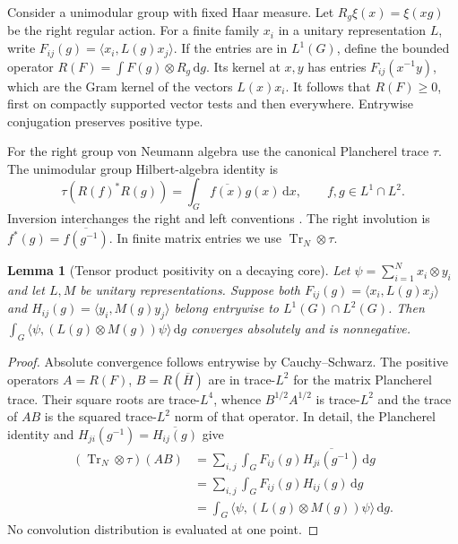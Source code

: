 \documentclass[11pt]{article}
\newtheorem{lemma}[theorem]{Lemma}
\newcommand{\Tr}{\operatorname{Tr}}
\newcommand{\dd}{\,\mathrm d}
\numberwithin{equation}{section}
\begin{document}
Consider a unimodular group with fixed Haar measure. Let
\(R_g\xi(x)=\xi(xg)\) be the right regular action. For a finite
family \(x_i\) in a unitary representation \(L\), write
\(F_{ij}(g)=\langle x_i,L(g)x_j\rangle\).
If the entries are in \(L^1(G)\), define the bounded operator
\(R(F)=\int F(g)\otimes R_g\dd g\). Its kernel at \(x,y\)
has entries \(F_{ij}(x^{-1}y)\), which are the Gram kernel of
the vectors \(L(x)x_i\). It follows that \(R(F)\ge0\), first
on compactly supported vector tests and then everywhere.
Entrywise conjugation preserves positive type.

For the right group von Neumann algebra use the canonical
Plancherel trace \(\tau\). The unimodular group Hilbert-algebra
identity is
\[
 \tau(R(f)^*R(g))=\int_G\overline{f(x)}g(x)\dd x,
                       \qquad f,g\in L^1\cap L^2.
\]
Inversion interchanges the right and left conventions
\cite{plancherel}. The right involution is
\(f^*(g)=\overline{f(g^{-1})}\). In finite matrix entries we use
\(\Tr_N\otimes\tau\).

\begin{lemma}[Tensor product positivity on a decaying core]
\label{lem:convolution}
Let \(\psi=\sum_{i=1}^{N}x_i\otimes y_i\) and let \(L,M\) be
unitary representations. Suppose both
\(F_{ij}(g)=\langle x_i,L(g)x_j\rangle\) and
\(H_{ij}(g)=\langle y_i,M(g)y_j\rangle\) belong entrywise to
\(L^1(G)\cap L^2(G)\). Then
\(\int_G\langle\psi,(L(g)\otimes M(g))\psi\rangle\dd g\)
converges absolutely and is nonnegative.
\end{lemma}

\begin{proof}
Absolute convergence follows entrywise by Cauchy--Schwarz.
The positive operators \(A=R(F)\), \(B=R(\overline H)\) are in
trace-\(L^2\) for the matrix Plancherel trace. Their square roots
are trace-\(L^4\), whence \(B^{1/2}A^{1/2}\) is trace-\(L^2\)
and the trace of \(AB\) is the squared trace-\(L^2\) norm of
that operator. In detail, the Plancherel identity and
\(H_{ji}(g^{-1})=\overline{H_{ij}(g)}\) give
\begin{align*}
 (\Tr_N\otimes\tau)(AB)
   &=\sum_{i,j}\int_G F_{ij}(g)
                              \overline{H_{ji}(g^{-1})}\dd g\\
   &=\sum_{i,j}\int_G F_{ij}(g)H_{ij}(g)\dd g\\
   &=\int_G\langle\psi,(L(g)\otimes M(g))\psi\rangle\dd g .
\end{align*}
No convolution distribution is evaluated at one point.
\end{proof}
\end{document}
